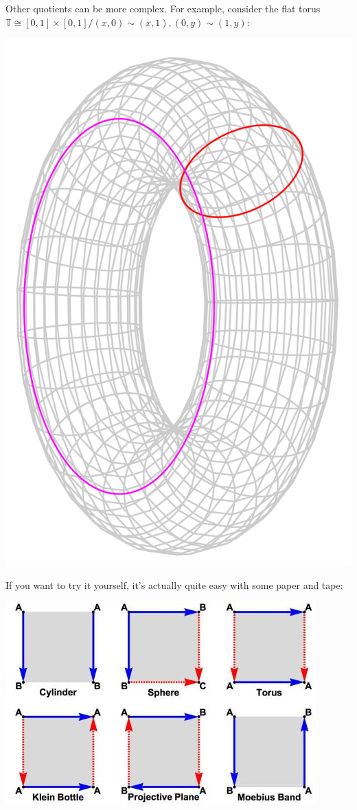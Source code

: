 \documentclass[tikz]{beamer}
\theoremstyle{definition}
\begin{document}
\frame
{
	Other quotients can be more complex. For example, consider the flat torus $\mathbb{T}  \cong [0,1] \times [0,1] / (x,0) \sim (x,1), (0, y) \sim (1, y)$: 
	
	\begin{center}
		\includegraphics[scale=0.1]{torus_skeleton}
	\end{center}
	 
}

\frame
{
	If you want to try it yourself, it's actually quite easy with some paper and tape: 
	
	\begin{center}
		\includegraphics[scale=0.4]{identification_spaces}
	\end{center}
	 
}
\end{document}
